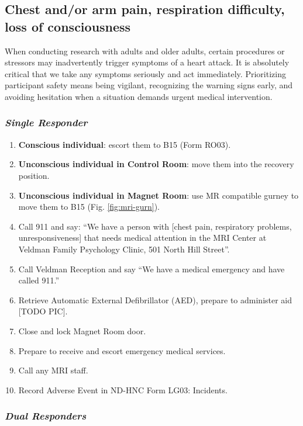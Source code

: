 \documentclass[11pt]{article}
\begin{document}
\subsection{Chest and/or arm pain, respiration difficulty, loss of consciousness}
\label{ssec:heart}

When conducting research with adults and older adults, certain procedures or stressors may inadvertently trigger symptoms of a heart attack. It is absolutely critical that we take any symptoms seriously and act immediately. Prioritizing participant safety means being vigilant, recognizing the warning signs early, and avoiding hesitation when a situation demands urgent medical intervention.

\subsubsection*{\textit{Single Responder}}

\begin{enumerate}
	\item \textbf{Conscious individual}: escort them to B15 (Form RO03).
	\item \textbf{Unconscious individual in Control Room}: move them into the recovery position.
	\item \textbf{Unconscious individual in Magnet Room}: use MR compatible gurney to move them to B15 (Fig. \ref{fig:mri-gurn}).
	\item Call 911 and say: ``We have a person with [chest pain, respiratory problems, unresponsiveness] that needs medical attention in the MRI Center at Veldman Family Psychology Clinic, 501 North Hill Street''.
	\item Call Veldman Reception and say ``We have a medical emergency and have called 911.''
	\item Retrieve Automatic External Defibrillator (AED), prepare to administer aid [TODO PIC].
	\item Close and lock Magnet Room door.
	\item Prepare to receive and escort emergency medical services.
	\item Call any MRI staff.
	\item Record Adverse Event in ND-HNC Form LG03: Incidents.
\end{enumerate}

\subsubsection*{\textit{Dual Responders}}
\end{document}
